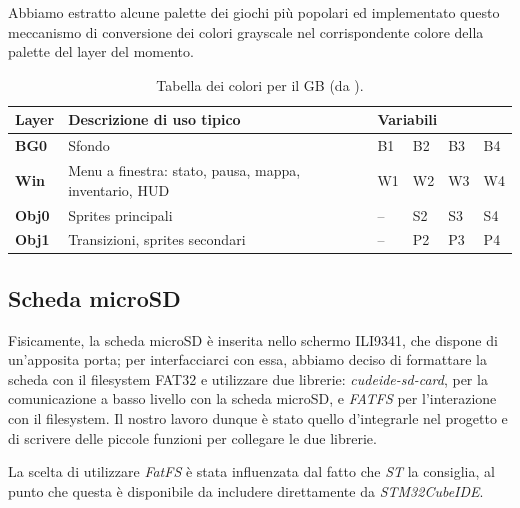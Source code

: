 \documentclass[hidelinks,12pt]{article}
\begin{document}
Abbiamo estratto alcune palette dei giochi più popolari ed implementato questo
meccanismo di conversione dei colori grayscale nel corrispondente colore della
palette del layer del momento.

\begin{table}[h]
	\begin{tabular}{|l|l|llll|}
		\hline
		\textbf{Layer} & \textbf{Descrizione di uso tipico}                    & \multicolumn{4}{l|}{\textbf{Variabili}}                                                          \\ \hline
		\textbf{BG0}   & Sfondo                                                & \multicolumn{1}{l|}{B1}                 & \multicolumn{1}{l|}{B2} & \multicolumn{1}{l|}{B3} & B4 \\ \hline
		\textbf{Win}   & Menu a finestra: stato, pausa, mappa, inventario, HUD & \multicolumn{1}{l|}{W1}                 & \multicolumn{1}{l|}{W2} & \multicolumn{1}{l|}{W3} & W4 \\ \hline
		\textbf{Obj0}  & Sprites principali                                    & \multicolumn{1}{l|}{–}                  & \multicolumn{1}{l|}{S2} & \multicolumn{1}{l|}{S3} & S4 \\ \hline
		\textbf{Obj1}  & Transizioni, sprites secondari                        & \multicolumn{1}{l|}{–}                  & \multicolumn{1}{l|}{P2} & \multicolumn{1}{l|}{P3} & P4 \\ \hline
	\end{tabular}
	\caption{Tabella dei colori per il GB (da
		\cite{GameBoyColors}).}
	\label{table:gb_colors}
\end{table}

\subsection{Scheda microSD}
Fisicamente, la scheda microSD è inserita nello schermo ILI9341, che dispone di
un'apposita porta; per interfacciarci con essa, abbiamo deciso di formattare la
scheda con il filesystem FAT32 e utilizzare due librerie:
\textit{cudeide-sd-card}, per la comunicazione a basso livello con la scheda
microSD, e \textit{FATFS} per l'interazione con il filesystem.
Il nostro lavoro dunque è stato quello d'integrarle nel progetto e di scrivere
delle piccole funzioni per collegare le due librerie.

La scelta di utilizzare \textit{FatFS} è stata influenzata dal fatto che
\textit{ST} la consiglia, al punto che questa è disponibile da includere
direttamente da \textit{STM32CubeIDE}. 
\end{document}
